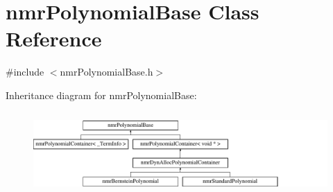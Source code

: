 \hypertarget{classnmr_polynomial_base}{}\section{nmr\+Polynomial\+Base Class Reference}
\label{classnmr_polynomial_base}


{\ttfamily \#include $<$nmr\+Polynomial\+Base.\+h$>$}

Inheritance diagram for nmr\+Polynomial\+Base\+:\begin{figure}[H]
\begin{center}
\leavevmode
\includegraphics[height=3.150492cm]{d8/d51/classnmr_polynomial_base}
\end{center}
\end{figure}
